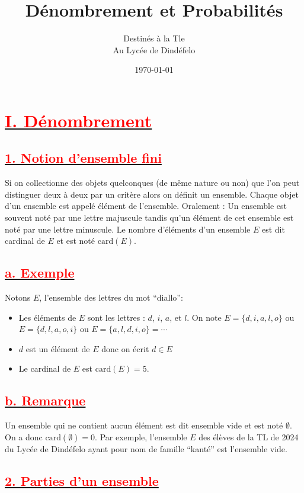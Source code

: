 \documentclass[12pt]{article}
\author{Destinés à la Tle\\Au Lycée de Dindéfelo}
\title{\textbf{Dénombrement et Probabilités}}
\date{\today}
\begin{document}
\maketitle
\newpage
\section*{\underline{\textbf{\textcolor{red}{I. Dénombrement}}}}
\subsection*{\underline{\textbf{\textcolor{red}{1. Notion d’ensemble fini}}}}
Si on collectionne des objets quelconques (de même nature ou non) que l’on peut distinguer deux à deux 
par un critère alors on définit un ensemble. Chaque objet d’un ensemble est appelé élément de l’ensemble. 
Oralement : Un ensemble est souvent noté par une lettre majuscule tandis qu’un élément de cet 
ensemble est noté par une lettre minuscule. Le nombre d’éléments d’un ensemble \(E\) est dit cardinal 
de \(E\) et est noté \(\text{card} (E)\).
\subsection*{\underline{\textbf{\textcolor{red}{a. Exemple}}}}
Notons \(E\), l’ensemble des lettres du mot ``diallo'':
\begin{itemize}
    \item Les éléments de \(E\) sont les lettres : \(d\), \(i\), \(a\), et \(l\). On note \(E = \{d, i, a, l, o\}\) ou 
    \(E = \{d, l, a, o, i\}\) ou \(E = \{a, l, d, i, o\} = \cdots\)
    \item \(d\) est un élément de \(E\) donc on écrit \(d \in E\) %
    \item Le cardinal de \(E\) est \(\text{card}(E) = 5\).
\end{itemize}
\subsection*{\underline{\textbf{\textcolor{red}{b. Remarque}}}}
Un ensemble qui ne contient aucun élément est dit ensemble vide et est noté \(\emptyset\). On a donc 
\(\text{card}(\emptyset) = 0\). Par exemple, l’ensemble \(E\) des élèves de la TL de 2024 du Lycée de 
Dindéfelo ayant pour nom de famille ``kanté'' est l’ensemble vide.
\subsection*{\underline{\textbf{\textcolor{red}{2. Parties d’un ensemble}}}}
\end{document}
